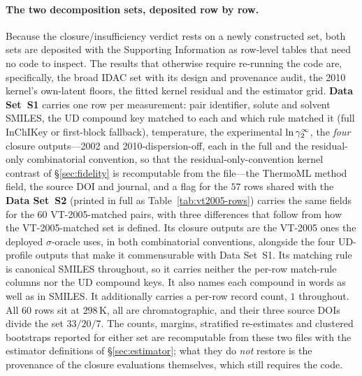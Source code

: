 \paragraph{The two decomposition sets, deposited row by row.} Because the closure/insufficiency
verdict rests on a newly constructed set, both sets are deposited with the Supporting Information as
row-level tables that need no code to inspect. The results that otherwise require re-running the code
are, specifically, the broad IDAC set with its design and provenance audit, the 2010 kernel's
own-latent floors, the fitted kernel residual and the estimator grid. \textbf{Data Set~S1} carries one
row per measurement: pair identifier, solute and solvent SMILES, the UD compound key matched to each
and which rule matched it (full InChIKey or first-block fallback), temperature, the experimental
$\ln\gamma_2^\infty$, the \emph{four} closure outputs---2002 and 2010-dispersion-off, each in the full and the
residual-only combinatorial convention, so that the residual-only-convention kernel contrast of
\S\ref{sec:fidelity} is recomputable from the file---the
ThermoML method field, the source DOI and journal, and a flag for the $57$ rows shared with the
\textbf{Data Set~S2} (printed in full as
Table~\ref{tab:vt2005-rows}) carries the same fields for the $60$ VT-2005-matched pairs, with three
differences that follow from how the VT-2005-matched set is defined. Its closure outputs are the VT-2005 ones the
deployed $\sigma$-oracle uses, in both combinatorial conventions, alongside the four
UD-profile outputs that make it commensurable with Data Set~S1. Its matching rule is canonical SMILES
throughout, so it carries neither the per-row match-rule columns nor the UD compound keys. It also
names each compound in words as well as in SMILES. It additionally carries a per-row record count,
$1$ throughout. All $60$ rows sit at $298$\,K, all are
chromatographic, and their three source DOIs divide the set $33/20/7$. The counts, margins,
stratified re-estimates and clustered bootstraps reported for either set are recomputable from these
two files with the estimator definitions of \S\ref{sec:estimator}; what they do \emph{not} restore is the
provenance of the closure evaluations themselves, which still requires the code.

